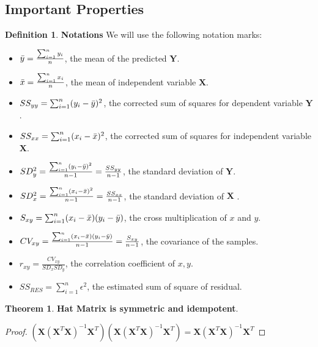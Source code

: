 \documentclass{article}
\theoremstyle{definition}
\newtheorem{defi}{Definition}[subsection]
\newtheorem{theorem}{Theorem}[subsection]
\begin{document}
\subsection{Important Properties}
\begin{defi}
\textbf{Notations} We will use the following notation marks:
\begin{itemize}
    \item $\Bar{y}=\frac{\sum_{i=1}^{n}y_i}{n}$, the mean of the predicted $\textbf{Y}$.
    \item $\Bar{x}=\frac{\sum_{i=1}^{n}x_i}{n}$, the mean of independent variable $\textbf{X}$.
    \item $SS_{yy}=\sum_{i=1}^{n}(y_i-\Bar{y})^2$, the corrected sum of squares for dependent variable $\textbf{Y}$.
    \item $SS_{xx}=\sum_{i=1}^{n}(x_i-\Bar{x})^2$, the corrected sum of squares for independent variable $\textbf{X}$.
    \item $SD_y^{2}=\frac{\sum_{i=1}^{n}(y_i-\Bar{y})^2}{n-1}=\frac{SS_{yy}}{n-1}$, the standard deviation of $\textbf{Y}$.
    \item $SD_x^{2}=\frac{\sum_{i=1}^{n}(x_i-\Bar{x})^2}{n-1}=\frac{SS_{xx}}{n-1}$, the standard deviation of $\textbf{X
    }$.
    \item $S_{xy}=\sum_{i=1}^{n}(x_i-\Bar{x})(y_i-\Bar{y})$, the cross multiplication of $x$ and $y$.
    \item $CV_{xy}=\frac{\sum_{i=1}^{n}(x_i-\Bar{x})(y_i-\Bar{y})}{n-1}=\frac{S_{xy}}{n-1}$, the covariance of the samples.
    \item $r_{xy}=\frac{CV_{xy}}{SD_xSD_y}$, the correlation coefficient of $x,y$.
    \item $SS_{RES}=\sum_{i=1}^{n}\epsilon^{2}$, the estimated sum of square of residual.
\end{itemize}
\end{defi}

\begin{theorem}
\textbf{Hat Matrix is symmetric and idempotent}.
\begin{proof}
$(\textbf{X}(\textbf{X}^{T}\textbf{X})^{-1}\textbf{X}^{T})(\textbf{X}(\textbf{X}^{T}\textbf{X})^{-1}\textbf{X}^{T})=\textbf{X}(\textbf{X}^{T}\textbf{X})^{-1}\textbf{X}^{T}$
\end{proof}
\end{theorem}
\end{document}

